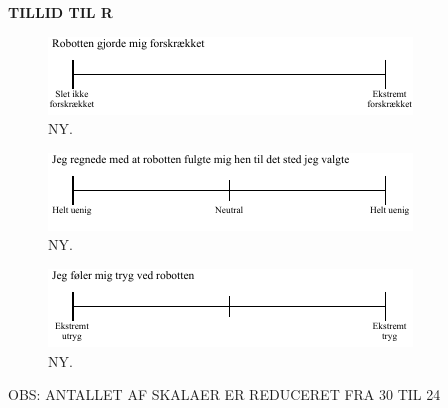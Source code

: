 \noindent
%
\textbf{TILLID TIL R}
%
\begin{figure}[H]
\centering
\includegraphics[width =\textwidth]{Figure/UdvalgteSkalaer/Forskraekket} 
\caption{NY.}
\label{fig:SkalaForskraekket}
\end{figure}
\noindent
%
%
\begin{figure}[H]
\centering
\includegraphics[width =\textwidth]{Figure/UdvalgteSkalaer/RobottenFulgteMigDetRigtigeStedHen} 
\caption{NY.}
\label{fig:SkalaRFulgteMigDetRigtigeStedHen}
\end{figure}
\noindent
%
%
\begin{figure}[H]
\centering
\includegraphics[width =\textwidth]{Figure/UdvalgteSkalaer/TrygVedR} 
\caption{NY.}
\label{fig:SkalaTrygVedR}
\end{figure}
\noindent
%


OBS: ANTALLET AF SKALAER ER REDUCERET FRA 30 TIL 24
